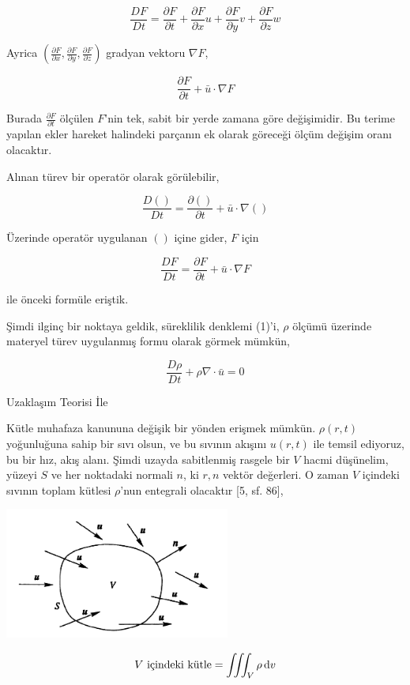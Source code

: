 \documentclass[12pt,fleqn]{article}\usepackage{../../common}
\begin{document}
$$
\frac{D F}{D t} =
\frac{\partial F}{\partial t} +
\frac{\partial F}{\partial x} u + 
\frac{\partial F}{\partial y} v + 
\frac{\partial F}{\partial z} w 
$$

Ayrica $(\frac{\partial F}{\partial x},\frac{\partial F}{\partial y},\frac{\partial F}{\partial z})$
gradyan vektoru $\nabla F$,

$$
\frac{\partial F}{\partial t} + \bar{u} \cdot \nabla F
$$

Burada $\frac{\partial F}{\partial t}$ ölçülen $F$'nin tek, sabit bir yerde
zamana göre değişimidir. Bu terime yapılan ekler hareket halindeki parçanın ek
olarak göreceği ölçüm değişim oranı olacaktır.

Alınan türev bir operatör olarak görülebilir, 

$$
\frac{D ()}{D t} = \frac{\partial () }{\partial t} + \bar{u} \cdot \nabla ()
$$

Üzerinde operatör uygulanan $()$ içine gider, $F$ için

$$
\frac{D F}{D t} = \frac{\partial F}{\partial t} + \bar{u} \cdot \nabla F
$$

ile önceki formüle eriştik.

Şimdi ilginç bir noktaya geldik, süreklilik denklemi (1)'i, $\rho$ ölçümü
üzerinde materyel türev uygulanmış formu olarak görmek mümkün,

$$
\frac{D \rho}{D t} + \rho \nabla \cdot \bar{u} = 0
$$

Uzaklaşım Teorisi İle

Kütle muhafaza kanununa değişik bir yönden erişmek mümkün. $\rho(r, t)$
yoğunluğuna sahip bir sıvı olsun, ve bu sıvının akışını $u(r, t)$ ile temsil
ediyoruz, bu bir hız, akış alanı. Şimdi uzayda sabitlenmiş rasgele bir $V$ hacmi
düşünelim, yüzeyi $S$ ve her noktadaki normali $n$, ki $r,n$ vektör değerleri. O
zaman $V$ içindeki sıvının toplam kütlesi $\rho$'nun entegrali olacaktır [5, sf. 86],

\includegraphics[width=20em]{phy_050_cons_01.png}

$$
V \textrm{ içindeki kütle} = \iiint_V \rho \,\mathrm{d} v
$$
\end{document}
